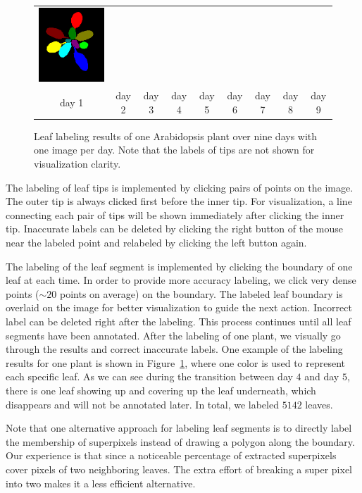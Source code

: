 \begin{figure}
\begin{centering}
\begin{tabular}{@{}c@{} c@{} c@{} c@{} c@{} c@{} c@{} c@{} c@{}}
\includegraphics[width=.11\textwidth]{Figures/labelExample/plant_1_day_9_num_13.png}\\
day 1 & day 2 & day 3 & day 4 & day 5 & day 6 & day 7 & day 8 & day 9 \\
\end{tabular}
\caption{Leaf labeling results of one Arabidopsis plant over nine days with one image per day. Note that the labels of tips are not shown for visualization clarity. }
\label{fig:LabelExample}
\end{centering}
\end{figure}

The labeling of leaf tips is implemented by clicking pairs of points on the image.
The outer tip is always clicked first before the inner tip.
For visualization, a line connecting each pair of tips will be shown immediately after clicking the inner tip.
Inaccurate labels can be deleted by clicking the right button of the mouse near the labeled point and relabeled by clicking the left button again.

The labeling of the leaf segment is implemented by clicking the boundary of one leaf at each time.
In order to provide more accuracy labeling, we click very dense points ($\sim20$ points on average) on the boundary.
The labeled leaf boundary is overlaid on the image for better visualization to guide the next action.
Incorrect label can be deleted right after the labeling.
This process continues until all leaf segments have been annotated.
After the labeling of one plant, we visually go through the results and correct inaccurate labels.
One example of the labeling results for one plant is shown in Figure~\ref{fig:LabelExample}, where one color is used to represent each specific leaf.
As we can see during the transition between day $4$ and day $5$, there is one leaf showing up and covering up the leaf underneath, which disappears and will not be annotated later.
In total, we labeled $5142$ leaves.

Note that one alternative approach for labeling leaf segments is to directly label the membership of superpixels instead of drawing a polygon along the boundary.
Our experience is that since a noticeable percentage of extracted superpixels cover pixels of two neighboring leaves.
The extra effort of breaking a super pixel into two makes it a less efficient alternative.




